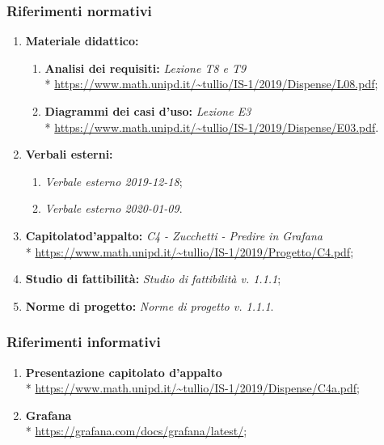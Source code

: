 		\subsubsection{Riferimenti normativi}
			\begin{enumerate}
				\item \textbf{Materiale didattico:}
				\begin{enumerate}
					\item \textbf{Analisi dei requisiti:} \textit{Lezione T8 e T9} \\*
						\url{https://www.math.unipd.it/~tullio/IS-1/2019/Dispense/L08.pdf};
					\item \textbf{Diagrammi dei casi d'uso:} \textit{Lezione E3} \\*
						\url{https://www.math.unipd.it/~tullio/IS-1/2019/Dispense/E03.pdf}.
				\end{enumerate}
				\item \textbf{Verbali esterni:} 
				\begin{enumerate}
					\item \textit{Verbale esterno 2019-12-18};
					\item \textit{Verbale esterno 2020-01-09}.
				\end{enumerate}
				\item \textbf{Capitolato\glosp d'appalto:} \textit{C4 - Zucchetti - Predire in Grafana} \\*
						\url{https://www.math.unipd.it/~tullio/IS-1/2019/Progetto/C4.pdf};
					\item \textbf{Studio di fattibilità:} \textit{Studio di fattibilità v. 1.1.1};
					\item \textbf{Norme di progetto:} \textit{Norme di progetto v. 1.1.1}.
			\end{enumerate}
		\subsubsection{Riferimenti informativi}
			\begin{enumerate}
				\item \textbf{Presentazione capitolato d'appalto} \\*
					\url{https://www.math.unipd.it/~tullio/IS-1/2019/Dispense/C4a.pdf};
				\item \textbf{Grafana} \\*
					\url{https://grafana.com/docs/grafana/latest/};
			\end{enumerate}
